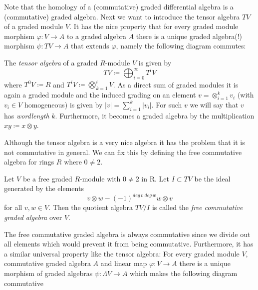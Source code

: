 Note that the homology of a (commutative) graded differential algebra is a (commutative) graded algebra. \newline
Next we want to introduce the tensor algebra $TV$ of a graded module $V$. It has the nice property
that for every graded module morphism $\varphi \colon V \to A$ to a graded algebra $A$ there is a unique 
graded algebra(!) morphism $\psi \colon TV \to A$ that extends $\varphi$, namely the following diagram commutes:

\centerline{ 
}

\begin{Definition}
 The \emph{tensor algebra} of a graded $R$-module $V$ is given by
 $$ TV \coloneqq \bigoplus_{i = 0}^\infty T^i V$$
 where $T^0 V \coloneqq R$ and $T^i V \coloneqq \bigotimes_{k=1}^i V$. \newline
 As a direct sum of graded modules it is again a graded module and the induced grading on an element
 $ v = \otimes_{i = 1}^k v_i $ (with $v_i \in V$ homogeneous) is given by $ |v| = \sum_{ i = 1}^k |v_i|$.
 For such $v$ we will say that $v$ has \emph{wordlength} $k$.
 Furthermore, it becomes a graded algebra by the multiplication $xy \coloneqq x \otimes y$.
\end{Definition}

Although the tensor algebra is a very nice algebra it has the problem that it is not commutative in general. We can fix this by
defining the free commutative algebra for rings $R$ where $0 \neq 2$.

\begin{Definition}
 Let $V$ be a free graded $R$-module with $0 \neq 2$ in R. Let $I \subset TV$ be the ideal generated by the elements
 $$ v \otimes w - (-1)^{deg \, v \; deg \, w} w \otimes v$$
 for all $v,w \in V$. Then the quotient algebra $TV/I$ is called the \emph{free commutative graded algebra} over $V$.
\end{Definition}

The free commutative graded algebra is always commutative since we divide out all elements which would prevent it 
from being commutative. Furthermore, it has a similar universal property like the tensor algebra: For every graded
module $V$, commutative graded algebra $A$ and linear map $\varphi \colon V \to A$ there is a unique morphism of
graded algebras $\psi \colon \Lambda V \to A$ which makes the following diagram commutative

